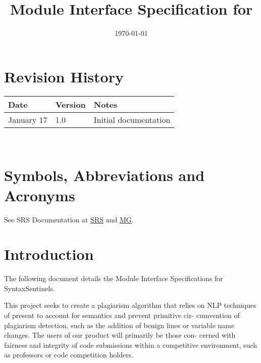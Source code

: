 \documentclass[12pt, titlepage]{article}
\begin{document}
\title{Module Interface Specification for \progname{}}

\author{\authname}

\date{\today}

\maketitle


\section{Revision History}

\begin{tabularx}{\textwidth}{p{3cm}p{2cm}X}
\toprule {\bf Date} & {\bf Version} & {\bf Notes}\\
\midrule
January 17 & 1.0 & Initial documentation\\
\bottomrule
\end{tabularx}

~\newpage

\section{Symbols, Abbreviations and Acronyms}

See SRS Documentation at \href{https://github.com/SyntaxSentinels/SyntaxSentinels/blob/main/docs/SRS-Volere/SRS.pdf}{SRS} and \href{https://github.com/SyntaxSentinels/SyntaxSentinels/blob/main/docs/Design/SoftArchitecture/MG.pdf}{MG}.


\newpage

\tableofcontents

\newpage


\section{Introduction}

The following document details the Module Interface Specifications for SyntaxSentinels.

This project seeks to create a plagiarism algorithm that relies on NLP
techniques of present to account for semantics and prevent primitive cir-
cumvention of plagiarism detection, such as the addition of benign lines or
variable name changes. The users of our product will primarily be those con-
cerned with fairness and integrity of code submissions within a competitive
environment, such as professors or code competition holders.
\end{document}
